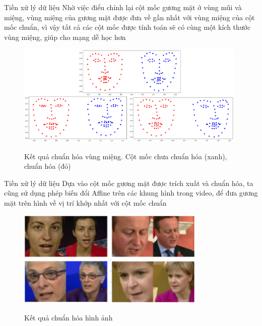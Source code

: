 \begin{frame}{Tiền xử lý dữ liệu}
    Nhờ việc điểu chỉnh lại cột mốc gương mặt ở vùng mũi và miệng, vùng miệng của gương mặt được đưa về gần nhất với vùng miệng của cột mốc chuẩn, vì vậy tất cả các cột mốc được tính toán sẽ có cùng một kích thước vùng miệng, giúp cho mạng dễ học hơn
    \begin{figure}[H]
        \centering
        \includegraphics[width=11cm]{images/landmark_alignment.png}
        \label{fig:landmark_alignment}
        \caption{Kết quả chuẩn hóa vùng miệng. Cột mốc chưa chuẩn hóa (xanh), chuẩn hóa (đỏ)}
    \end{figure}
\end{frame}

\begin{frame}{Tiền xử lý dữ liệu}
    Dựa vào cột mốc gương mặt được trích xuất và chuẩn hóa, ta cũng sử dụng phép biến đổi Affine trên các khung hình trong video, để đưa gương mặt trên hình về vị trí khớp nhất với cột mốc chuẩn
    \begin{figure}[H]
        \centering
        \includegraphics[width=9cm]{images/preprocessed-image.png}
        \label{fig:preprocessed-image}
        \caption{Kết quả chuẩn hóa hình ảnh}
    \end{figure}
\end{frame}

